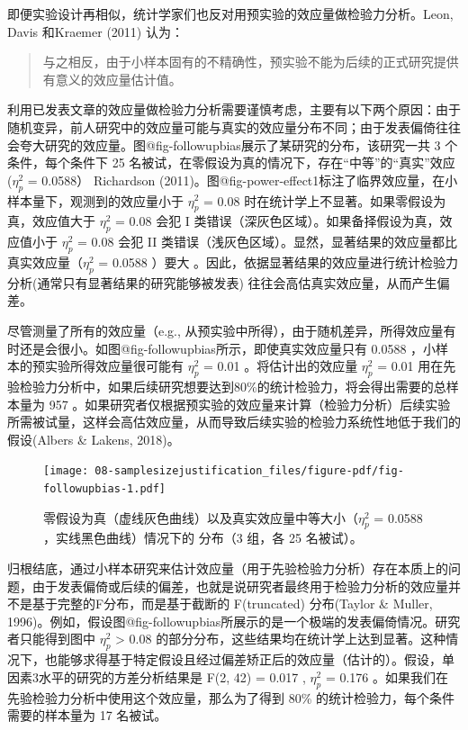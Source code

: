 \documentclass[
  letterpaper,
  DIV=11,
  numbers=noendperiod]{scrreprt}
\begin{document}
即便实验设计再相似，统计学家们也反对用预实验的效应量做检验力分析。Leon,
Davis 和Kraemer (2011) 认为：

\begin{quote}
与之相反，由于小样本固有的不精确性，预实验不能为后续的正式研究提供有意义的效应量估计值。
\end{quote}

利用已发表文章的效应量做检验力分析需要谨慎考虑，主要有以下两个原因：由于随机变异，前人研究中的效应量可能与真实的效应量分布不同；由于发表偏倚往往会夸大研究的效应量。图@fig-followupbias展示了某研究的分布，该研究一共
3 个条件，每个条件下 25
名被试，在零假设为真的情况下，存在``中等''的``真实''效应 (\(\eta_p^2\) =
0.0588） Richardson
(2011)。图@fig-power-effect1标注了临界效应量，在小样本量下，观测到的效应量小于
\(\eta_p^2\) = 0.08 时在统计学上不显著。如果零假设为真，效应值大于
\(\eta_p^2\) = 0.08 会犯 I
类错误（深灰色区域）。如果备择假设为真，效应值小于 \(\eta_p^2\) = 0.08
会犯 II
类错误（浅灰色区域）。显然，显著结果的效应量都比真实效应量（\(\eta_p^2\)
= 0.0588 ）要大
。因此，依据显著结果的效应量进行统计检验力分析(通常只有显著结果的研究能够被发表)
往往会高估真实效应量，从而产生偏差。

尽管测量了所有的效应量（e.g.,
从预实验中所得），由于随机差异，所得效应量有时还是会很小。如图@fig-followupbias所示，即使真实效应量只有
0.0588 ，小样本的预实验所得效应量很可能有 \(\eta_p^2\) = 0.01
。将估计出的效应量 \(\eta_p^2\) = 0.01
用在先验检验力分析中，如果后续研究想要达到80\%的统计检验力，将会得出需要的总样本量为
957
。如果研究者仅根据预实验的效应量来计算（检验力分析）后续实验所需被试量，这样会高估效应量，从而导致后续实验的检验力系统性地低于我们的假设(Albers
\& Lakens, 2018)。

\begin{figure}

{\centering \texttt{[image: 08-samplesizejustification\_files/figure-pdf/fig-followupbias-1.pdf]}

}

\caption{\label{fig-followupbias}零假设为真（虚线灰色曲线）以及真实效应量中等大小（\(\eta_p^2\)
= 0.0588 ，实线黑色曲线）情况下的 分布（3 组，各 25 名被试）。}

\end{figure}

归根结底，通过小样本研究来估计效应量（用于先验检验力分析）存在本质上的问题，由于发表偏倚或后续的偏差，也就是说研究者最终用于检验力分析的效应量并不是基于完整的F分布，而是基于截断的
F(truncated) 分布(Taylor \& Muller,
1996)。例如，假设图@fig-followupbias所展示的是一个极端的发表偏倚情况。研究者只能得到图中
\(\eta_p^2\) \textgreater{} 0.08
的部分分布，这些结果均在统计学上达到显著。这种情况下，也能够求得基于特定假设且经过偏差矫正后的效应量（估计的）。假设，单因素3水平的研究的方差分析结果是
F(2, 42) = 0.017 , \(\eta_p^2\) = 0.176
。如果我们在先验检验力分析中使用这个效应量，那么为了得到 80\%
的统计检验力，每个条件需要的样本量为 17 名被试。
\end{document}
